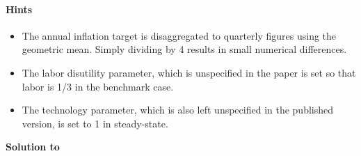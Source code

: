 \paragraph{Hints}

\begin{itemize}

\item The annual inflation target is disaggregated to quarterly figures using the geometric mean.
Simply dividing by 4 results in small numerical differences.

\item The labor disutility parameter, which is unspecified in the paper is set so that labor is 1/3 in the benchmark case.

\item The technology parameter, which is also left unspecified in the published version, is set to 1 in steady-state.
  
\end{itemize}


\begin{solution}\textbf{Solution to }
\ifDisplaySolutions%

\fi
\newpage
\end{solution}